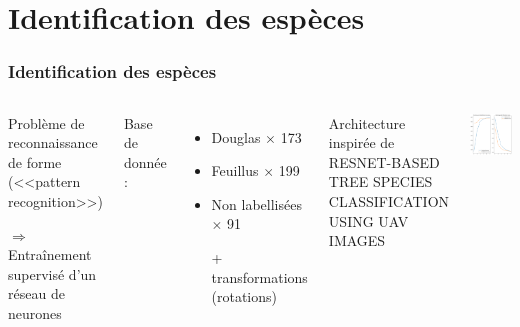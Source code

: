 \documentclass{beamer}
\begin{document}
\section{Identification des espèces}

\begin{frame}
	\frametitle{Identification des espèces}
	\begin{columns}
		\begin{center}
		Problème de reconnaissance de forme (<<pattern recognition>>)

		$\Rightarrow$  Entraînement supervisé d'un réseau de neurones\\
		\end{center}
		Base de donnée : 
		\begin{itemize}
			\item Douglas $\times$ 173
			\item Feuillus $\times$ 199
			\item Non labellisées $\times$ 91
			\item[+] transformations (rotations)
		\end{itemize}

		Architecture inspirée de RESNET-BASED TREE SPECIES CLASSIFICATION USING UAV IMAGES

		\centering
		\includegraphics[scale=0.33]{train.png}
	\end{columns}
	
\end{frame}
\end{document}
